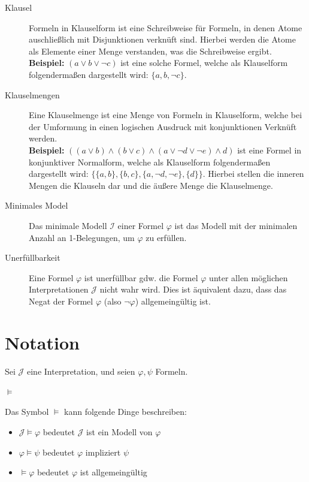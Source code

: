 \documentclass[a4paper, 11pt, accentcolor = tud3b]{tudreport}
\begin{document}
\begin{description}
                \item[Klausel] Formeln in Klauselform ist eine Schreibweise für Formeln, in denen Atome auschließlich mit Disjunktionen verknüft sind. Hierbei werden die Atome als Elemente einer Menge verstanden, was die Schreibweise ergibt. \\ \textbf{Beispiel:} $ (a \lor b \lor \lnot c) $ ist eine solche Formel, welche als Klauselform folgendermaßen dargestellt wird: $ \{ a, b, \lnot c \} $.
                \item[Klauselmengen] Eine Klauselmenge ist eine Menge von Formeln in Klauselform, welche bei der Umformung in einen logischen Ausdruck mit konjunktionen Verknüft werden. \\ \textbf{Beispiel:} $ ((a \lor b) \land (b \lor c) \land (a \lor \lnot d \lor \lnot e) \land d) $ ist eine Formel in konjunktiver Normalform, welche als Klauselform folgendermaßen dargestellt wird: $ \{ \{ a, b \}, \{ b, c \}, \{ a, \lnot d, \lnot e \}, \{ d \} \} $. Hierbei stellen die inneren Mengen die Klauseln dar und die äußere Menge die Klauselmenge.
                \item[Minimales Model] Das minimale Modell $ \mathcal{I} $ einer Formel $ \varphi $ ist das Modell mit der minimalen Anzahl an 1-Belegungen, um $ \varphi $ zu erfüllen.
                \item[Unerfüllbarkeit] Eine Formel $ \varphi $ ist unerfüllbar gdw. die Formel $ \varphi $ unter allen möglichen Interpretationen $ \mathcal{J} $ nicht wahr wird. Dies ist äquivalent dazu, dass das Negat der Formel $ \varphi $ (also $ \lnot \varphi $) allgemeingültig ist.
            \end{description}

        \section{Notation}
            Sei $ \mathcal{J} $ eine Interpretation, und seien $ \varphi, \psi $ Formeln.

            \paragraph{$ \models $}
                Das Symbol $ \models $ kann folgende Dinge beschreiben:
                \begin{itemize}
                    \item $ \mathcal{J} \models \varphi $ bedeutet $ \mathcal{J} $ ist ein Modell von $ \varphi $
                    \item $ \varphi \models \psi $ bedeutet $ \varphi $ impliziert $ \psi $
                    \item $ \models \varphi $ bedeutet $ \varphi $ ist allgemeingültig
                \end{itemize}
\end{document}
